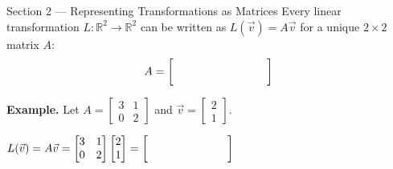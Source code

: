 \documentclass[10pt]{article}
\begin{document}
\vspace{0.08in}

\begin{notesbox}{Section 2 --- Representing Transformations as Matrices}
\small
Every linear transformation $L:\mathbb{R}^2\to\mathbb{R}^2$ can be written as
$L(\vec{v}) = A\vec{v}$ for a unique $2\times 2$ matrix $A$:
\[
  A = \begin{bmatrix}\hspace{1.3cm} & \hspace{1.3cm}\\\hspace{1.3cm} & \hspace{1.3cm}\end{bmatrix}
\]

\textbf{Example.}  Let $A = \begin{bmatrix}3 & 1 \\ 0 & 2\end{bmatrix}$
and $\vec{v} = \begin{bmatrix}2\\1\end{bmatrix}$.

\vspace{0.06in}
$L(\vec{v}) = A\vec{v} =
\begin{bmatrix}3 & 1 \\ 0 & 2\end{bmatrix}
\begin{bmatrix}2\\1\end{bmatrix}
= \begin{bmatrix}\hspace{2.5cm}\\\hspace{2.5cm}\end{bmatrix}$
\end{notesbox}

\vspace{0.08in}
\end{document}
